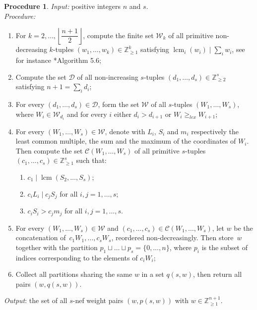 \documentclass{amsart}
\DeclareMathOperator{\lcm}{lcm}
\newcommand{\Z}{\mathbb{Z}}
\theoremstyle{definition}
\newtheorem{procedure}[lem]{Procedure}
\begin{document}
\begin{procedure}\label{proc:weights}
\emph{Input:} positive integers $n$ and $s$.\\ \emph{Procedure:}
\begin{enumerate}
  \item \label{weights:1} For $k=2,\dots,\left\lfloor\dfrac{n+1}{2}\right\rfloor$, compute the finite set $\mathcal{W}_k$ of all primitive non-decreasing $k$-tuples $(w_1,\dots,w_k)\in\Z_{\geq 1}^k$ satisfying $\lcm_i(w_i)\mid \sum_{i}w_i$, see for instance \cite{B}*{Algorithm 5.6};
  \item \label{weights:2} Compute the set $\mathcal{D}$ of all non-increasing $s$-tuples $(d_1,\dots,d_s)\in\Z_{\geq 2}^s$ satisfying $n+1=\sum_id_i$;
  \item \label{weights:3} For every $(d_1,\dots,d_s)\in\mathcal{D}$, form the set $\mathcal{W}$ of all $s$-tuples $(W_1,\dots,W_s)$, where $W_i\in\mathcal{W}_{d_i}$ and for every $i$ either $d_i>d_{i+1}$ or $W_i\geq_{lex}W_{i+1}$;
  \item \label{weights:4} For every $(W_1,\dots,W_s)\in\mathcal{W}$, denote with $L_i$, $S_i$ and $m_i$ respectively the least common multiple, the sum and the maximum of the coordinates of $W_i$. Then compute the set $\mathcal{C}(W_1,\dots,W_s)$ of all primitive $s$-tuples~$(c_1,\dots,c_s)\in\Z_{\geq1}^s$ such that:
  \vspace{3pt}
  \begin{enumerate}
      \item $c_1\mid \lcm(S_2,\dots,S_s)$;
      \vspace{3pt}
      \item $c_i L_i\mid c_jS_j$ for all $i,j=1,\dots,s$;
      \item $c_iS_i>c_jm_j$ for all $i,j=1,\dots,s$.
  \end{enumerate}
  \vspace{3pt}
  \item\label{weights:5} For every $(W_1,\dots,W_s)\in\mathcal{W}$ and $(c_1,\dots,c_s)\in\mathcal{C}(W_1,\dots,W_s)$, let $w$ be the concatenation of~$c_1W_1,\dots,c_sW_s$, reordered non-decreasingly. Then store~$w$ together with the partition $p_1\sqcup\dots\sqcup p_s=\{0,\dots,n\}$, where $p_i$ is the subset of indices corresponding to the elements of $c_iW_i$;
  \item \label{weights:6} Collect all partitions sharing the same $w$ in a set $q(s,w)$, then return all pairs $(w,q(s,w))$.
\end{enumerate}
\emph{Output}: the set of all $s$-nef weight pairs $(w,p(s,w))$ with $w\in\Z^{n+1}_{\geq 1}$.
\end{procedure}
\end{document}
